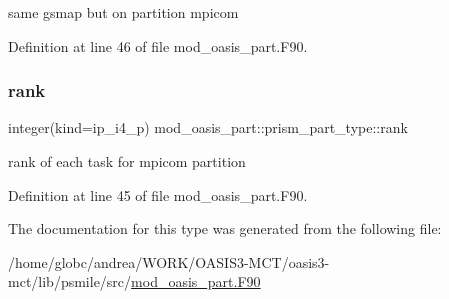 same gsmap but on partition mpicom 



Definition at line 46 of file mod\+\_\+oasis\+\_\+part.\+F90.

\mbox{\label{structmod__oasis__part_1_1prism__part__type_a1bf56b7dcc55c07cab5d1be13d33cfdd}} 
\subsubsection{\texorpdfstring{rank}{rank}}
{\footnotesize\ttfamily integer(kind=ip\+\_\+i4\+\_\+p) mod\+\_\+oasis\+\_\+part\+::prism\+\_\+part\+\_\+type\+::rank\hspace{0.3cm}{\ttfamily [private]}}



rank of each task for mpicom partition 



Definition at line 45 of file mod\+\_\+oasis\+\_\+part.\+F90.



The documentation for this type was generated from the following file\+:\begin{DoxyCompactItemize}
\item 
/home/globc/andrea/\+W\+O\+R\+K/\+O\+A\+S\+I\+S3-\/\+M\+C\+T/oasis3-\/mct/lib/psmile/src/\hyperlink{mod__oasis__part_8_f90}{mod\+\_\+oasis\+\_\+part.\+F90}\end{DoxyCompactItemize}
